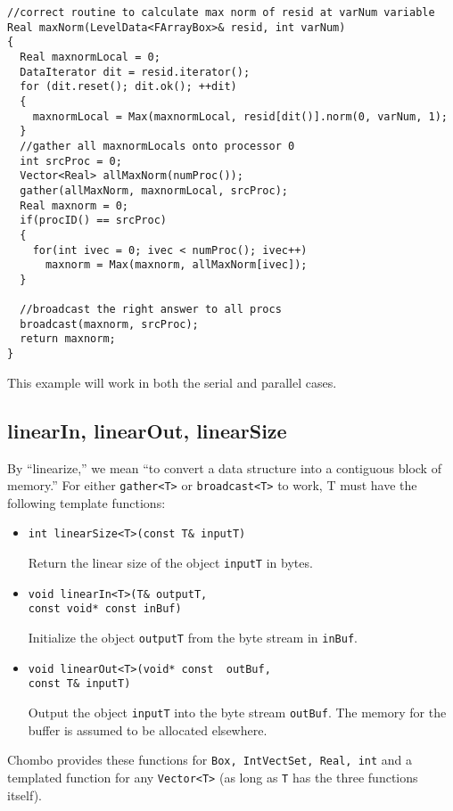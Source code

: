\small \begin{verbatim}
//correct routine to calculate max norm of resid at varNum variable
Real maxNorm(LevelData<FArrayBox>& resid, int varNum)
{
  Real maxnormLocal = 0;
  DataIterator dit = resid.iterator();
  for (dit.reset(); dit.ok(); ++dit)
  {      
    maxnormLocal = Max(maxnormLocal, resid[dit()].norm(0, varNum, 1);
  }
  //gather all maxnormLocals onto processor 0
  int srcProc = 0;
  Vector<Real> allMaxNorm(numProc());
  gather(allMaxNorm, maxnormLocal, srcProc);
  Real maxnorm = 0;
  if(procID() == srcProc)
  {
    for(int ivec = 0; ivec < numProc(); ivec++)
      maxnorm = Max(maxnorm, allMaxNorm[ivec]);
  }
  
  //broadcast the right answer to all procs
  broadcast(maxnorm, srcProc);
  return maxnorm;
}
\end{verbatim} \normalsize
This example will work in both the serial and parallel cases.


\subsection{linearIn, linearOut, linearSize}
\label{LinearSection}

By ``linearize,'' we mean ``to convert a data structure into
a contiguous block of memory.''
For either \verb/gather<T>/  or  \verb/broadcast<T>/ to work,
T must have the following template functions: 
\begin{itemize}
\item \begin{verbatim} 
int linearSize<T>(const T& inputT)
\end{verbatim}
Return the linear size of the object \verb/inputT/ in bytes.

\item \begin{verbatim} 
void linearIn<T>(T& outputT, 
const void* const inBuf)
\end{verbatim}
Initialize the object \verb/outputT/ from the byte stream
in \verb/inBuf/.  

\item \begin{verbatim} 
void linearOut<T>(void* const  outBuf, 
const T& inputT)
\end{verbatim}
Output the object \verb/inputT/ into the byte stream
\verb/outBuf/.  The memory for the buffer is assumed to be
allocated elsewhere.
\end{itemize}
Chombo provides these
functions for {\tt Box, IntVectSet, Real, int} and a templated
function for any \verb/Vector<T>/ (as long as \verb/T/ has
the three functions itself).

